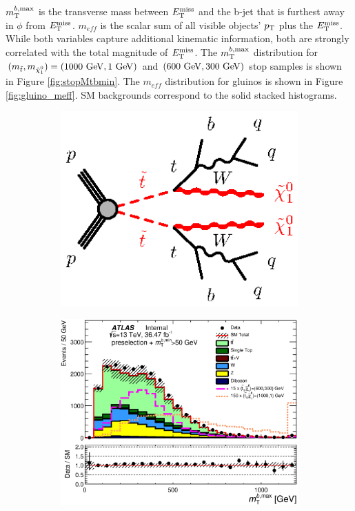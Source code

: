 \indent $m_{\mathrm{T}}^{b,\mathrm{max}}$ is the transverse mass between $E_{\mathrm{T}}^{\mathrm{miss}}$ and the b-jet that is furthest away in $\phi$ from $E_{\mathrm{T}}^{\mathrm{miss}}$.  $m_{eff}$ is the scalar sum of all visible objects' $p_{\mathrm{T}}$ plus the $E_{\mathrm{T}}^{\mathrm{miss}}$.  While both variables capture additional kinematic information, both are strongly correlated with the total magnitude of $E_{\mathrm{T}}^{\mathrm{miss}}$.  The $m_{\mathrm{T}}^{b,\mathrm{max}}$ distribution for $(m_{\stop}, m_{\ninoone}) = (1000 \gev,1 \gev)$ and $(600 \gev, 300 \gev)$ stop samples is shown in Figure \ref{fig:stopMtbmin}.  The $m_{eff}$ distribution for gluinos is shown in Figure \ref{fig:gluino_meff}.  SM backgrounds correspond to the solid stacked histograms. \\

\begin{figure}[h!]
  \begin{center}
    \begin{subfigure}[b]{0.30\textwidth}
        \includegraphics[width=\textwidth]{figures/feynDiag/stst-bqqbqqN1N1-tt.eps}%
                \caption{ }
    \end{subfigure}
    \begin{subfigure}[b]{0.45\textwidth}
        \includegraphics[width=\textwidth]{figures/preselection/MtBMax_preCutSRPlot_withRatio.eps}

\end{subfigure}
\end{center}
\end{figure}
